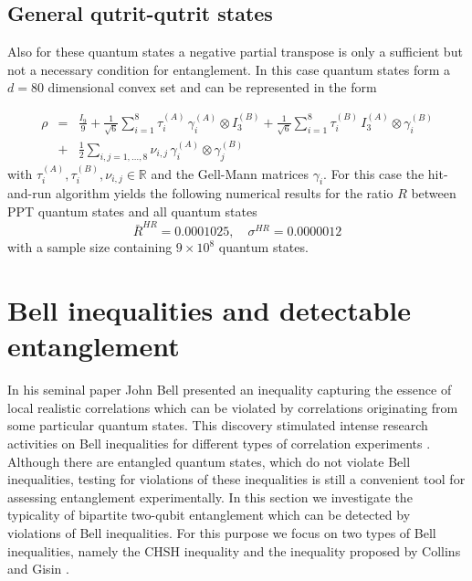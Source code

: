\documentclass[12pt]{iopart}
\begin{document}
\subsection{General qutrit-qutrit states}
\label{sec:qtqtgen}

Also for these quantum states a negative partial transpose is only a sufficient but not a necessary condition for entanglement. In this case quantum states form a $d = 80$ dimensional convex set and can 
be represented in the form

\begin{eqnarray}
\rho &=& \frac{I_9}{9} + \frac{1}{\sqrt{6}}\sum^8_{i=1} \tau^{(A)}_i \,\gamma_i^{(A)} \otimes I^{(B)}_3+ \frac{1}{\sqrt{6}}\sum_{i=1}^8 \tau^{(B)}_i \,I^{(A)}_3 \otimes \gamma^{(B)}_i  \nonumber\\
 &+&
 \frac{1}{2}\sum_{i,j=1, \dots, 8} \nu_{i,j} \,\gamma_i^{(A)} \otimes \gamma^{(B)}_j
\label{qubitqutrit}
\end{eqnarray}
with $\tau^{(A)}_i,\tau^{(B)}_i,\nu_{i,j}\in \mathbb{R}$ and the Gell-Mann matrices $\gamma_i$. For this case the hit-and-run algorithm yields the following numerical results for the ratio $R$ between PPT quantum states and all quantum states
\begin{equation}
  \bar{R}^{HR}=0.0001025, \quad \sigma^{HR}=0.0000012
\end{equation}
with a sample size containing $9 \times 10^8$ quantum states.

\section{Bell inequalities and detectable entanglement}
\label{IV}

In his seminal paper \cite{Bell} John Bell presented an inequality capturing the essence of local realistic correlations which can be violated by correlations originating from some particular  quantum states. This discovery stimulated intense research activities on Bell inequalities for different types of correlation experiments \cite{Pitowsky}. Although there are entangled quantum states, which do not violate Bell inequalities, testing for violations of these inequalities is still a
convenient tool for assessing entanglement experimentally. 
In this section we investigate 
the typicality of bipartite two-qubit entanglement which can be detected by violations of Bell inequalities.
For this purpose we focus on two types of Bell inequalities, namely
the CHSH inequality \cite{CHSH} and the inequality proposed by Collins and Gisin \cite{CG}.
\end{document}

